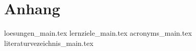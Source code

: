 
\part{Anhang}

{loesungen_main.tex}
{lernziele_main.tex}
{acronyms_main.tex}
{literaturvezeichnis_main.tex}